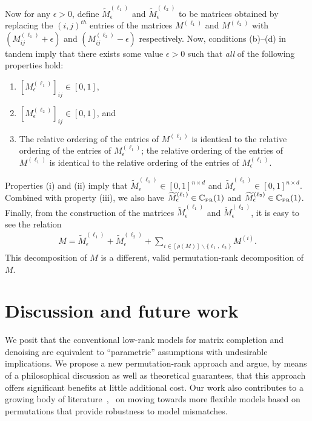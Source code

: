 \documentclass[11pt, hidelinks]{article} %
\newcommand{\numrows}{n}
\newcommand{\numcols}{d}
\newcommand{\wtmatrix}{M}
\newcommand{\wt}{\wtmatrix}
\newcommand{\wttil}{\widetilde{\wtmatrix}}
\newcommand{\matrixset}{\mathbb{C}}
\newcommand{\permset}{\matrixset_{\mbox{\tiny PR}}}
\newcommand{\permone}{\permset(1)}
\newcommand{\permrank}{\rho}
\newcommand{\fnpermrank}[1]{\overline{\permrank}(#1)}
\begin{document}
Now for any $\epsilon > 0$, define $\wttil^{(\ell_1)}_\epsilon$ and $\wttil^{(\ell_2)}_\epsilon$ to be matrices obtained by replacing  the
$(i,j)^{th}$ entries of the matrices $\wt^{(\ell_1)}$ and
$\wt^{(\ell_2)}$ with $(\wt^{(\ell_1)}_{ij} + \epsilon)$ and
$(\wt^{(\ell_2)}_{ij} - \epsilon)$ respectively.
Now, conditions (b)--(d) in tandem imply that there exists some value
$\epsilon > 0$ such that \emph{all} of the following properties
hold:
\begin{enumerate}[label=(\roman*),topsep=0pt,itemsep=-1ex,partopsep=1ex,parsep=1ex]
\item $[\wt^{(\ell_1)}_\epsilon]_{ij} \in [0,1]$,
\item $[\wt^{(\ell_2)}_\epsilon]_{ij}  \in [0,1]$, and 
\item The relative ordering of the entries of $\wt^{(\ell_1)}$ is identical to the relative ordering of the entries of $\wt^{(\ell_1)}_\epsilon$; the relative ordering of the entries of $\wt^{(\ell_1)}$ is identical to the relative ordering of the entries of $\wt^{(\ell_1)}_\epsilon$.%
\end{enumerate}
Properties (i) and (ii) imply that $\wttil^{(\ell_1)}_\epsilon \in [0,1]^{\numrows \times \numcols}$ and $\wttil^{(\ell_2)}_\epsilon \in [0,1]^{\numrows \times \numcols}$. Combined with property (iii), we also have $\wttil^{(\ell_1)}_\epsilon \in \permone$ and $\wttil^{(\ell_2)}_\epsilon \in \permone$. Finally, from the construction of the matrices $\wttil^{(\ell_1)}_\epsilon$ and $\wttil^{(\ell_2)}_\epsilon$, it is easy to see the relation 
\begin{align*}
\wt = \wttil^{(\ell_1)}_\epsilon + \wttil^{(\ell_2)}_\epsilon + \sum_{i \in [ \fnpermrank{\wt}] \backslash \{\ell_1,\ell_2\}} \wt^{(i)}.
\end{align*} 
This decomposition of $\wt$ is a different, valid permutation-rank decomposition of $\wt$. 


\section{Discussion and future work}
\label{SecConclusion}

We posit that the conventional low-rank models for matrix completion
and denoising are equivalent to ``parametric'' assumptions with
undesirable implications. We propose a new permutation-rank approach
and argue, by means of a philosophical discussion as well as
theoretical guarantees, that this approach offers significant benefits
at little additional cost. Our work also contributes to a growing body of literature~\cite[Part~1]{shah2017thesis},~\cite{shah2015stochastically, shah2015simple, shah2016permutation, shah2016feeling,heckel2016active, chatterjee2016estimation, flammarion2016optimal, chen2017competitive} on moving towards more flexible models based on permutations
that provide robustness to model mismatches.
\end{document}

